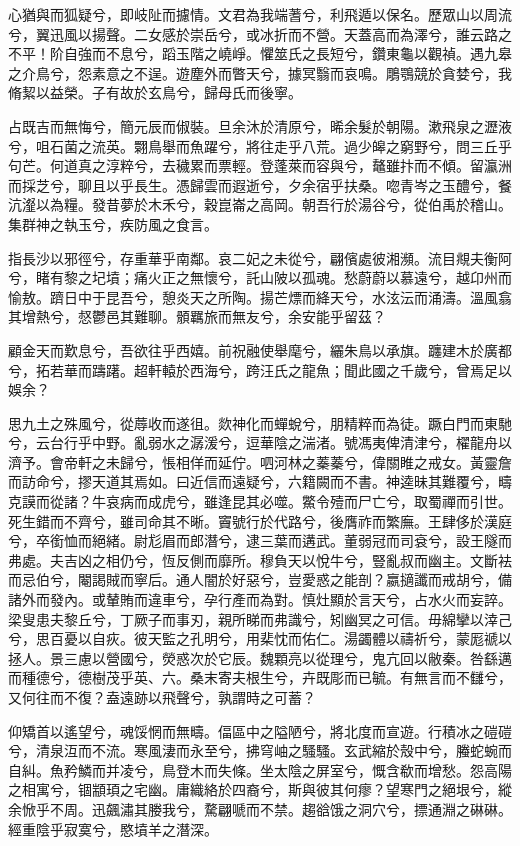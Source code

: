 \begin{pinyinscope}
心猶與而狐疑兮，即岐阯而攄情。文君為我端蓍兮，利飛遁以保名。歷眾山以周流兮，翼迅風以揚聲。二女感於崇岳兮，或冰折而不營。天蓋高而為澤兮，誰云路之不平！阶自強而不息兮，蹈玉階之嶢崢。懼筮氏之長短兮，鑽東龜以觀禎。遇九皋之介鳥兮，怨素意之不逞。遊塵外而瞥天兮，據冥翳而哀鳴。鵰鶚競於貪婪兮，我脩絜以益榮。子有故於玄鳥兮，歸母氏而後寧。

占既吉而無悔兮，簡元辰而俶裝。旦余沐於清原兮，晞余髮於朝陽。漱飛泉之瀝液兮，咀石菌之流英。翾鳥舉而魚躍兮，將往走乎八荒。過少皞之窮野兮，問三丘乎句芒。何道真之淳粹兮，去穢累而票輕。登蓬萊而容與兮，鼇雖抃而不傾。留瀛洲而採芝兮，聊且以乎長生。憑歸雲而遐逝兮，夕余宿乎扶桑。唿青岑之玉醴兮，餐沆瀣以為糧。發昔夢於木禾兮，穀崑崙之高岡。朝吾行於湯谷兮，從伯禹於稽山。集群神之執玉兮，疾防風之食言。

指長沙以邪徑兮，存重華乎南鄰。哀二妃之未從兮，翩儐處彼湘瀕。流目覜夫衡阿兮，睹有黎之圮墳；痛火正之無懷兮，託山陂以孤魂。愁蔚蔚以慕遠兮，越卬州而愉敖。躋日中于昆吾兮，憩炎天之所陶。揚芒熛而絳天兮，水泫沄而涌濤。溫風翕其增熱兮，惄鬱邑其難聊。顝羈旅而無友兮，余安能乎留茲？

顧金天而歎息兮，吾欲往乎西嬉。前祝融使舉麾兮，纚朱鳥以承旗。躔建木於廣都兮，拓若華而躊躇。超軒轅於西海兮，跨汪氏之龍魚；聞此國之千歲兮，曾焉足以娛余？

思九土之殊風兮，從蓐收而遂徂。欻神化而蟬蛻兮，朋精粹而為徒。蹶白門而東馳兮，云台行乎中野。亂弱水之潺湲兮，逗華陰之湍渚。號馮夷俾清津兮，櫂龍舟以濟予。會帝軒之未歸兮，悵相佯而延佇。呬河林之蓁蓁兮，偉關睢之戒女。黃靈詹而訪命兮，摎天道其焉如。曰近信而遠疑兮，六籍闕而不書。神逵昧其難覆兮，疇克謨而從諸？牛哀病而成虎兮，雖逢昆其必噬。鱉令殪而尸亡兮，取蜀禪而引世。死生錯而不齊兮，雖司命其不晰。竇號行於代路兮，後膺祚而繁廡。王肆侈於漢庭兮，卒銜恤而絕緒。尉尨眉而郎潛兮，逮三葉而遘武。董弱冠而司袞兮，設王隧而弗處。夫吉凶之相仍兮，恆反側而靡所。穆負天以悅牛兮，豎亂叔而幽主。文斷袪而忌伯兮，閹謁賊而寧后。通人闇於好惡兮，豈愛惑之能剖？嬴擿讖而戒胡兮，備諸外而發內。或輦賄而違車兮，孕行產而為對。慎灶顯於言天兮，占水火而妄誶。梁叟患夫黎丘兮，丁厥子而事刃，親所睇而弗識兮，矧幽冥之可信。毋綿攣以涬己兮，思百憂以自疢。彼天監之孔明兮，用棐忱而佑仁。湯蠲體以禱祈兮，蒙厖禠以拯人。景三慮以營國兮，熒惑次於它辰。魏顆亮以從理兮，鬼亢回以敝秦。咎繇邁而種德兮，德樹茂乎英、六。桑末寄夫根生兮，卉既彫而已毓。有無言而不讎兮，又何往而不復？盍遠跡以飛聲兮，孰謂時之可蓄？

仰矯首以遙望兮，魂馁惘而無疇。偪區中之隘陋兮，將北度而宣遊。行積冰之磑磑兮，清泉沍而不流。寒風淒而永至兮，拂穹岫之騷騷。玄武縮於殼中兮，螣蛇蜿而自糾。魚矜鱗而并凌兮，鳥登木而失條。坐太陰之屏室兮，慨含欷而增愁。怨高陽之相寓兮，锢顓頊之宅幽。庸織絡於四裔兮，斯與彼其何瘳？望寒門之絕垠兮，縱余惞乎不周。迅飆潚其媵我兮，騖翩嗁而不禁。趨谽饿之洞穴兮，摽通淵之碄碄。經重陰乎寂寞兮，愍墳羊之潛深。


\end{pinyinscope}
